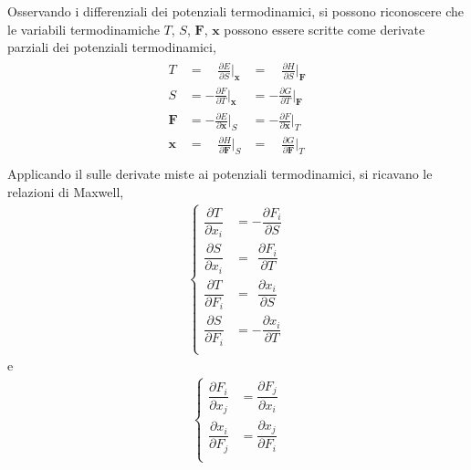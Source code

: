 \documentclass[letterpaper,10pt,english]{jupyterBook}
\begin{document}
\sphinxAtStartPar
{} Osservando i differenziali dei potenziali termodinamici, si possono riconoscere che le variabili termodinamiche \(T\), \(S\), \(\mathbf{F}\), \(\mathbf{x}\) possono essere scritte come derivate parziali dei potenziali termodinamici,
\begin{equation*}
\begin{split}\begin{aligned}
 T & = \quad \frac{\partial E}{\partial S}\Big|_{\mathbf{x}} & = \quad \frac{\partial H}{\partial S}\Big|_{\mathbf{F}} \\
 S & =     - \frac{\partial F}{\partial T}\Big|_{\mathbf{x}} & =     - \frac{\partial G}{\partial T}\Big|_{\mathbf{F}} \\
 \mathbf{F} & =     - \frac{\partial E}{\partial \mathbf{x}}\Big|_{S} & = - \frac{\partial F}{\partial \mathbf{x}}\Big|_{T} \\
 \mathbf{x} & = \quad \frac{\partial H}{\partial \mathbf{F}}\Big|_{S} & = \quad \frac{\partial G}{\partial \mathbf{F}}\Big|_{T}\\
\end{aligned}\end{split}
\end{equation*}
\sphinxAtStartPar
{} Applicando il  sulle derivate miste ai potenziali termodinamici, si ricavano le relazioni di Maxwell,
\begin{equation*}
\begin{split}\begin{cases}
 \dfrac{\partial T}{\partial x_i} & =   - \dfrac{\partial F_i}{\partial S} \\
 \dfrac{\partial S}{\partial x_i} & = \ \ \dfrac{\partial F_i}{\partial T} \\
 \dfrac{\partial T}{\partial F_i} & = \ \ \dfrac{\partial x_i}{\partial S} \\
 \dfrac{\partial S}{\partial F_i} & =   - \dfrac{\partial x_i}{\partial T} \\
\end{cases}\end{split}
\end{equation*}
\sphinxAtStartPar
e
\begin{equation*}
\begin{split}\begin{cases}
 \dfrac{\partial F_i}{\partial x_j} & =  \dfrac{\partial F_j}{\partial x_i} \\
 \dfrac{\partial x_i}{\partial F_j} & =  \dfrac{\partial x_j}{\partial F_i} \\
\end{cases}\end{split}
\end{equation*}
\sphinxstepscope
\end{document}
